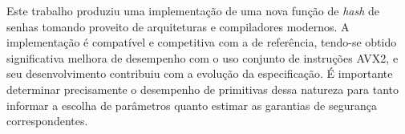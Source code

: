 \documentclass{article}
\begin{document}
Este trabalho produziu uma implementação de uma nova função de
\emph{hash} de senhas tomando proveito de arquiteturas e compiladores
modernos. A implementação é compatível e competitiva com a de
referência, tendo-se obtido significativa melhora de desempenho com o
uso conjunto de instruções AVX2, e seu desenvolvimento contribuiu com a
evolução da especificação.
É importante determinar precisamente o desempenho de primitivas dessa natureza para tanto informar a escolha de parâmetros
quanto estimar as garantias de segurança correspondentes.



\end{document}
